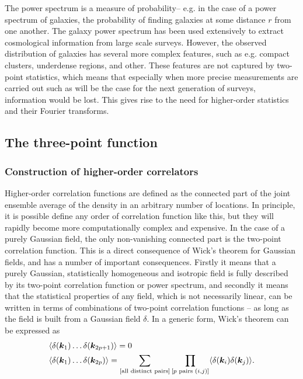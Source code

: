 The power spectrum is a measure of probability-- e.g. in the case of a power spectrum of galaxies, the probability of finding galaxies at some distance $r$ from one another. The galaxy power spectrum has been used extensively to extract cosmological information from large scale surveys. However, the observed distribution of galaxies has several more complex features, such as e.g. compact clusters, underdense regions, and other. These features are not captured by two-point statistics, which means that especially when more precise measurements are carried out such as will be the case for the next generation of surveys, information would be lost. This gives rise to the need for higher-order statistics and their Fourier transforms. 

\subsection{The three-point function}

\subsubsection{Construction of higher-order correlators}

Higher-order correlation functions are defined as the connected part of the joint ensemble average of the density in an arbitrary number of locations. In principle, it is possible define any order of correlation function like this, but they will rapidly become more computationally complex and expensive. In the case of a purely Gaussian field, the only non-vanishing connected part is the two-point correlation function. This is a direct consequence of Wick's theorem for Gaussian fields, and has a number of important consequences. Firstly it means that a purely Gaussian, statistically homogeneous and isotropic field is fully described by its two-point correlation function or power spectrum, and secondly it means that the statistical properties of any field, which is not necessarily linear, can be written in terms of combinations of two-point correlation functions -- as long as the field is built from a Gaussian field $\delta$. In a generic form, Wick's theorem can be expressed as 
\begin{align}
	&\langle \delta(\bm {k}_1) \ldots \delta(\bm{k}_{2p + 1}) \rangle = 0 \nonumber \\
	&\langle \delta(\bm {k}_1) \ldots \delta(\bm{k}_{2p})\rangle = \sum_{[\text{all distinct pairs}]} \prod_{[p \text{ pairs } (i,j)]} \langle \delta(\bm{k}_i) \delta(\bm{k}_j) \rangle.  
\end{align}

